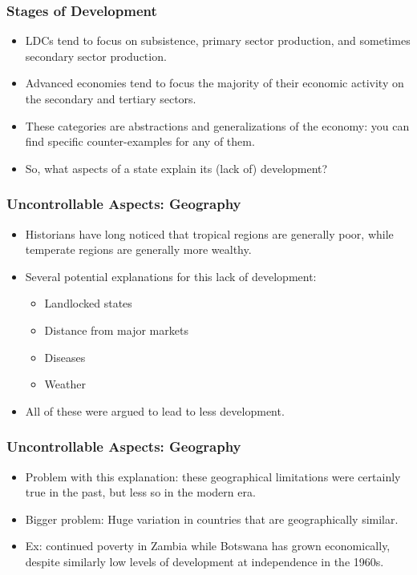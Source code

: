 \documentclass[handout]{beamer}
\begin{document}
\begin{frame} 
	\frametitle{\LARGE{Stages of Development}}
	\begin{itemize}
		\item LDCs tend to focus on subsistence, primary sector production, and sometimes secondary sector production. \pause
		\item Advanced economies tend to focus the majority of their economic activity on the secondary and tertiary sectors. \pause
		\item These categories are abstractions and generalizations of the economy: you can find specific counter-examples for any of them.
		\item So, what aspects of a state explain its (lack of) development?
	\end{itemize}
\end{frame}

\begin{frame} 
\frametitle{\LARGE{Uncontrollable Aspects: Geography}}
\begin{itemize}
		\item Historians have long noticed that tropical regions are generally poor, while temperate regions are generally more wealthy. \pause
		\item Several potential explanations for this lack of development:
		\begin{itemize}
			\item Landlocked states \pause
			\item Distance from major markets \pause
			\item Diseases \pause
			\item Weather \pause
		\end{itemize}
		\item All of these were argued to lead to less development. 
\end{itemize}
\end{frame}

\begin{frame} 
	\frametitle{\LARGE{Uncontrollable Aspects: Geography}}
	\begin{itemize}
		\item Problem with this explanation: these geographical limitations were certainly true in the past, but less so in the modern era. \pause
		\item Bigger problem: Huge variation in countries that are geographically similar. \pause
		\item Ex: continued poverty in Zambia while Botswana has grown economically, despite similarly low levels of development at independence in the 1960s.
	\end{itemize}
\end{frame}
\end{document}
